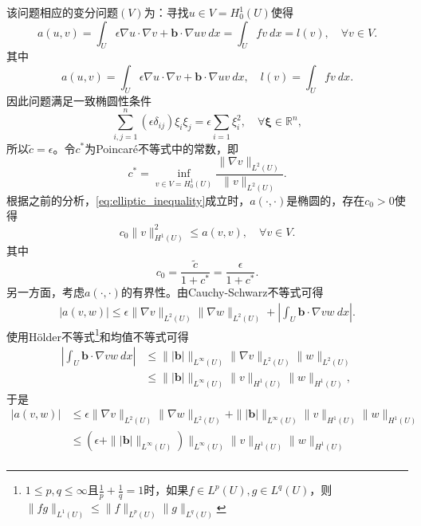\documentclass[a4paper,10pt]{ctexart}
\begin{document}
\begin{example}
    该问题相应的变分问题$ (V) $为：寻找$ u\in V=H^1_0(U) $使得
    \begin{equation}
        a(u,v) = \int_U \epsilon \nabla u\cdot \nabla v + \bm{b}\cdot\nabla u v\ d x = \int_U fv\ d x = l(v),\quad \forall v\in V.
    \end{equation}
    其中
    \[
        a(u,v) = \int_U \epsilon \nabla u\cdot \nabla v + \bm{b}\cdot\nabla u v\ d x,\quad l(v) = \int_U fv\ d x.
    \]
    因此问题满足一致椭圆性条件
    \[
        \sum_{i,j=1}^n (\epsilon \delta_{ij}) \xi_i\xi_j = \epsilon \sum_{i=1}\xi_i^2,\quad \forall \bm{\xi}\in \mathbb{R}^n,
    \]
    所以$ \tilde{c}=\epsilon $。令$ c^* $为Poincaré不等式中的常数，即
    \[
        c^* = \inf_{v\in V=H^1_0(U)}\frac{\| \nabla v \|_{L^2(U)}}{\| v \|_{L^2(U)}}.
    \]
    根据之前的分析，\eqref{eq:elliptic_inequality}成立时，$ a(\cdot,\cdot) $是椭圆的，存在$ c_0>0 $使得
    \[
        c_0\| v \|_{H^1(U)}^2 \leqslant a(v,v),\quad \forall v\in V.
    \]
    其中
    \begin{equation}
        c_0 = \frac{\tilde{c}}{1+c^*} = \frac{\epsilon}{1+c^*}.
    \end{equation}
    另一方面，考虑$ a(\cdot,\cdot) $的有界性。由Cauchy-Schwarz不等式可得
    \[
        \begin{aligned}
            |a(v,w)| \leqslant \epsilon \| \nabla v \|_{L^2(U)}\| \nabla w \|_{L^2(U)} + \left| \int_U \bm{b}\cdot \nabla vw\ d x  \right| .
        \end{aligned}
    \]
    使用Hölder不等式\footnote{$ 1\leqslant p,q\leqslant \infty $且$ \frac{1}{p}+\frac{1}{q}=1 $时，如果$ f\in L^p(U),g\in L^q(U) $，则$ \| fg \|_{L^1(U)} \leqslant \| f \|_{L^p(U)} \| g \|_{L^q(U)} $}和均值不等式可得
    \[
        \begin{aligned}
            \left| \int_U \bm{b}\cdot \nabla vw\ d x  \right| 
            &\leqslant \| |\bm{b}| \|_{L^\infty(U)} \| \nabla v \|_{L^2(U)} \| w \|_{L^2(U)}\\
            &\leqslant \| |\bm{b}| \|_{L^\infty(U)} \| v \|_{H^1(U)} \| w \|_{H^1(U)},
        \end{aligned}
    \]
    于是
    \[
        \begin{aligned}
            |a(v,w)|
            &\leqslant \epsilon \| \nabla v \|_{L^2(U)}\| \nabla w \|_{L^2(U)} + \| |\bm{b}| \|_{L^\infty(U)} \| v \|_{H^1(U)} \| w \|_{H^1(U)}\\
            &\leqslant \left( \epsilon + \| |\bm{b}| \|_{L^\infty(U)} \right) \|_{L^\infty(U)} \| v \|_{H^1(U)} \| w \|_{H^1(U)}\\

\end{aligned}\]
\end{example}
\end{document}
